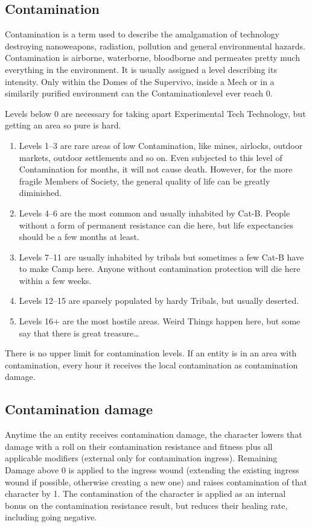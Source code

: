 \subsection{Contamination}\label{subsec:contamination}
Contamination is a term used to describe the amalgamation of \-technology destroying \-nanoweapons, \-radiation, \-pollution
and general \-environmental \-hazards.
Contamination is air\-borne, waterborne, bloodborne and per\-meates pretty much everything in the environment.
It is usually assigned a \-level \-describing its intensity.
Only within the Domes of the Supervivo, \-inside a Mech or in a similarily \-purified environment can the \-
Contamination\-level ever reach 0. \par
Levels below 0 are necessary for taking apart Experimental Tech Technology, but getting an area so pure is hard.\par
\begin{enumerate}[label = - ]
\item Levels 1--3
are rare areas of low Contamination, like mines, airlocks, outdoor markets, outdoor settlements and so on.
Even subjected to this level of Contamination for months, it will not cause death.
However, for the more fragile Members of Society, the general quality of life can be greatly diminished.
\item Levels 4--6
are the most common and usually inhabited by Cat-B\@.
People without a form of permanent resistance can die here, but life expectancies should be a few months at least.
\item Levels 7--11
are usually inhabited by tribals but sometimes a few Cat-B have to make Camp here.
Anyone without contamination protection will die here within a few weeks.
\item Levels 12--15
are sparsely populated by hardy Tribals, but usually deserted.
\item Levels 16+
are the most hostile areas.
Weird Things happen here, but some say that there is great treasure\ldots
\end{enumerate}
There is no upper limit for contamination levels.
If an entity is in an area with contamination, every hour it receives the local contamination
as contamination damage.\par

\subsection{Contamination damage}\label{subsec:contamination-damage}
Anytime the an entity receives contamination damage, the character lowers that damage with a roll on their contamination
resistance and fitness plus all applicable modifiers (external only for contamination ingress).
Remaining Damage above 0 is applied to the ingress wound (extending the existing ingress wound if possible,
otherwise creating a new one) and raises contamination of that character by 1.
The contamination of the character is applied as an internal bonus on the contamination resistance result, but reduces
their healing rate, including going negative.




